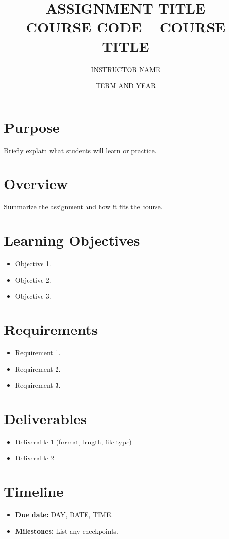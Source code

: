 \documentclass[12pt]{article}
\title{ASSIGNMENT TITLE\\\large COURSE CODE -- COURSE TITLE}
\author{INSTRUCTOR NAME}
\date{TERM AND YEAR}
\begin{document}
\maketitle


\section*{Purpose}
Briefly explain what students will learn or practice.

\section*{Overview}
Summarize the assignment and how it fits the course.

\section*{Learning Objectives}
\begin{itemize}
\item Objective 1.
\item Objective 2.
\item Objective 3.
\end{itemize}

\section*{Requirements}
\begin{itemize}
\item Requirement 1.
\item Requirement 2.
\item Requirement 3.
\end{itemize}

\section*{Deliverables}
\begin{itemize}
\item Deliverable 1 (format, length, file type).
\item Deliverable 2.
\end{itemize}

\section*{Timeline}
\begin{itemize}
\item \textbf{Due date:} DAY, DATE, TIME.
\item \textbf{Milestones:} List any checkpoints.
\end{itemize}
\end{document}
